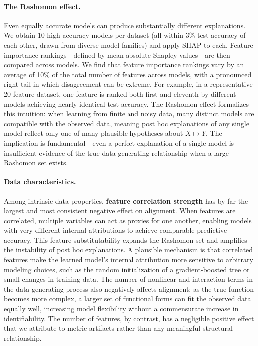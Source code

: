 \documentclass[11pt]{article}
\begin{document}
\paragraph{The Rashomon effect.}
Even equally accurate models can produce substantially different explanations. We obtain 10 high-accuracy models per dataset (all within 3\% test accuracy of each other, drawn from diverse model families) and apply SHAP to each. Feature importance rankings---defined by mean absolute Shapley values---are then compared across models. We find that feature importance rankings vary by an average of 10\% of the total number of features across models, with a pronounced right tail in which disagreement can be extreme. For example, in a representative 20-feature dataset, one feature is ranked both first and eleventh by different models achieving nearly identical test accuracy. The Rashomon effect \citep{semenova22rashomon, paes23inevitable} formalizes this intuition: when learning from finite and noisy data, many distinct models are compatible with the observed data, meaning post hoc explanations of any single model reflect only one of many plausible hypotheses about $X \mapsto Y$. The implication is fundamental---even a perfect explanation of a single model is insufficient evidence of the true data-generating relationship when a large Rashomon set exists.

\paragraph{Data characteristics.}
Among intrinsic data properties, \textbf{feature correlation strength} has by far the largest and most consistent negative effect on alignment. When features are correlated, multiple variables can act as proxies for one another, enabling models with very different internal attributions to achieve comparable predictive accuracy. This feature substitutability expands the Rashomon set and amplifies the instability of post hoc explanations. A plausible mechanism is that correlated features make the learned model's internal attribution more sensitive to arbitrary modeling choices, such as the random initialization of a gradient-boosted tree or small changes in training data. The number of nonlinear and interaction terms in the data-generating process also negatively affects alignment: as the true function becomes more complex, a larger set of functional forms can fit the observed data equally well, increasing model flexibility without a commensurate increase in identifiability. The number of features, by contrast, has a negligible positive effect that we attribute to metric artifacts rather than any meaningful structural relationship.
\end{document}
